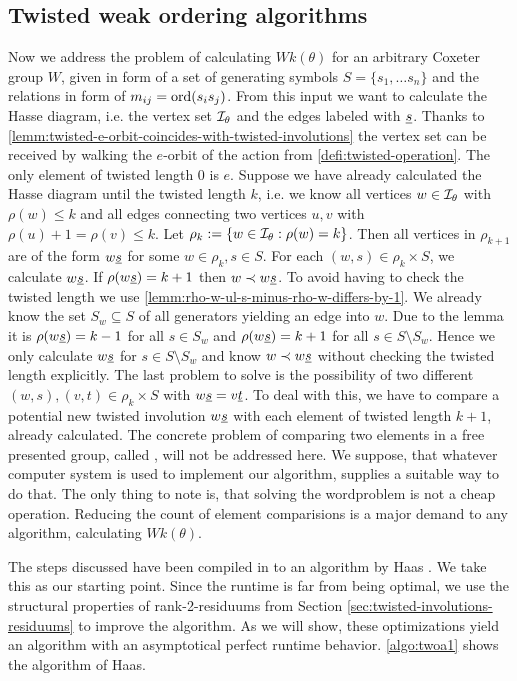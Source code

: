 \subsection{Twisted weak ordering algorithms}
\label{sec:twisted-involutions-algorithms}

Now we address the problem of calculating $Wk(\theta)$ for an arbitrary Coxeter group $W$, given in form of a set of generating symbols $S = \{s_1, \ldots s_n\}$ and the relations in form of $m_{ij} = \operatorname{ord}(s_i s_j)$. From this input we want to calculate the Hasse diagram, i.e. the vertex set $\mathcal{I}_{\theta}$ and the edges labeled with $\underline{s}$. Thanks to \ref{lemm:twisted-e-orbit-coincides-with-twisted-involutions} the vertex set can be received by walking the $e$-orbit of the action from \ref{defi:twisted-operation}. The only element of twisted length 0 is $e$. Suppose we have already calculated the Hasse diagram until the twisted length $k$, i.e. we know all vertices $w \in \mathcal{I}_{\theta}$ with $\rho(w) \leq k$ and all edges connecting two vertices $u,v$ with $\rho(u) + 1 = \rho(v) \leq k$. Let $\rho_k := \{ w \in \mathcal{I}_{\theta} : \rho(w) = k \}$. Then all vertices in $\rho_{k+1}$ are of the form $w \underline{s}$ for some $w \in \rho_k, s \in S$. For each $(w,s) \in \rho_k \times S$, we calculate $w \underline{s}$. If $\rho(w \underline{s}) = k + 1$ then $w \prec w \underline{s}$. To avoid having to check the twisted length we use \ref{lemm:rho-w-ul-s-minus-rho-w-differs-by-1}. We already know the set $S_w \subseteq S$ of all generators yielding an edge into $w$. Due to the lemma it is $\rho(w \underline{s}) = k - 1$ for all $s \in S_w$ and $\rho(w \underline{s}) = k + 1$ for all $s \in S \setminus S_w$. Hence we only calculate $w \underline{s}$ for $s \in S \setminus S_w$ and know $w \prec w \underline{s}$ without checking the twisted length explicitly. The last problem to solve is the possibility of two different $(w,s),(v,t) \in \rho_k \times S$ with $w \underline{s} = v \underline{t}$. To deal with this, we have to compare a potential new twisted involution $w \underline{s}$ with each element of twisted length $k+1$, already calculated. The concrete problem of comparing two elements in a free presented group, called , will not be addressed here. We suppose, that whatever computer system is used to implement our algorithm, supplies a suitable way to do that. The only thing to note is, that solving the wordproblem is not a cheap operation. Reducing the count of element comparisions is a major demand to any algorithm, calculating $Wk(\theta)$.

The steps discussed have been compiled in to an algorithm by Haas \cite[Algorithm 3.1.1]{haas:twoa}. We take this as our starting point. Since the runtime is far from being optimal, we use the structural properties of rank-2-residuums from Section \ref{sec:twisted-involutions-residuums} to improve the algorithm. As we will show, these optimizations yield an algorithm with an asymptotical perfect runtime behavior. \ref{algo:twoa1} shows the algorithm of Haas.

